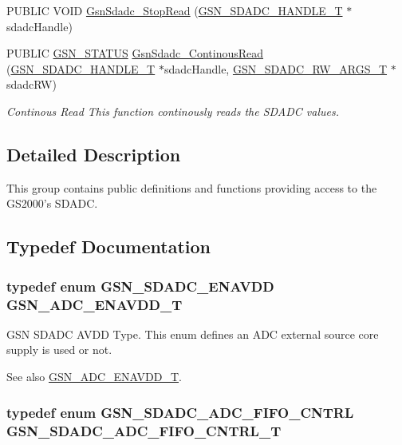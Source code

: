 \begin{DoxyCompactItemize}
PUBLIC VOID \hyperlink{a00652_ga3fef35337d14db3014789953e98ee2fa}{GsnSdadc\_\-StopRead} (\hyperlink{a00214}{GSN\_\-SDADC\_\-HANDLE\_\-T} $\ast$sdadcHandle)
\item 
PUBLIC \hyperlink{a00660_gada5951904ac6110b1fa95e51a9ddc217}{GSN\_\-STATUS} \hyperlink{a00652_ga8cdb1e407d22f1c971ab1fdfc6c9ea90}{GsnSdadc\_\-ContinousRead} (\hyperlink{a00214}{GSN\_\-SDADC\_\-HANDLE\_\-T} $\ast$sdadcHandle, \hyperlink{a00215}{GSN\_\-SDADC\_\-RW\_\-ARGS\_\-T} $\ast$sdadcRW)
\begin{DoxyCompactList}\small\item\em Continous Read This function continously reads the SDADC values. \end{DoxyCompactList}\end{DoxyCompactItemize}


\subsection{Detailed Description}
This group contains public definitions and functions providing access to the GS2000's SDADC. 

\subsection{Typedef Documentation}
\hypertarget{a00652_ga46353c29cf1b862e0ab85b39b68176af}{
\subsubsection[{GSN\_\-ADC\_\-ENAVDD\_\-T}]{\setlength{\rightskip}{0pt plus 5cm}typedef enum {\bf GSN\_\-SDADC\_\-ENAVDD}  {\bf GSN\_\-ADC\_\-ENAVDD\_\-T}}}
\label{a00652_ga46353c29cf1b862e0ab85b39b68176af}


GSN SDADC AVDD Type. This enum defines an ADC external source core supply is used or not. 

\begin{DoxySeeAlso}{See also}
\hyperlink{a00652_ga46353c29cf1b862e0ab85b39b68176af}{GSN\_\-ADC\_\-ENAVDD\_\-T}. 
\end{DoxySeeAlso}
\hypertarget{a00652_gaf55aace91b55b8544afeb27482cc70d4}{
\subsubsection[{GSN\_\-SDADC\_\-ADC\_\-FIFO\_\-CNTRL\_\-T}]{\setlength{\rightskip}{0pt plus 5cm}typedef enum {\bf GSN\_\-SDADC\_\-ADC\_\-FIFO\_\-CNTRL}  {\bf GSN\_\-SDADC\_\-ADC\_\-FIFO\_\-CNTRL\_\-T}}}
\label{a00652_gaf55aace91b55b8544afeb27482cc70d4}


